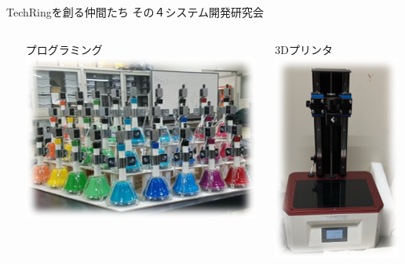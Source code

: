 \documentclass[dvipdfmx]{beamer}
\begin{document}
\begin{frame}{TechRingを創る仲間たち その４}{システム開発研究会}
\begin{footnotesize}
\begin{columns}[T,totalwidth=1.01\textwidth]
\begin{column}{.20\textwidth}
\begin{center}
        \end{center}
      \end{column}
      \begin{column}{.20\textwidth}
        \begin{center}
          \alert{プログラミング}\\
          \includegraphics[scale=0.3]{pic/shisuken5.png}
        \end{center}
      \end{column}
      \begin{column}{.20\textwidth}
        \begin{center}
          \alert{3Dプリンタ}\\
          \includegraphics[scale=0.45]{pic/shisuken4.png}
        \end{center}
      \end{column}
    \end{columns}
  \end{footnotesize}


\end{frame}
\end{document}
